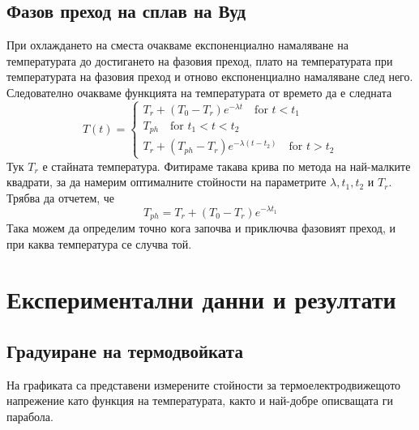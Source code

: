 \documentclass[aps, prb, twocolumn, a4paper, floatfix, reprint]{revtex4-2}
\begin{document}
\subsection{Фазов преход на сплав на Вуд}
При охлаждането на сместа очакваме експоненциално намаляване на температурата до достигането на фазовия преход, плато на температурата при температурата на фазовия преход и отново експоненциално намаляване след него. Следователно очакваме функцията на температурата от времето да е следната
\begin{equation*} \label{eq:1}
    T(t) = \begin{cases}
        T_r + (T_0 - T_r) e^{-\lambda t} \quad \text{for } t < t_1 \\
        T_{ph} \quad \text{for } t_1 < t < t_2 \\
        T_r + (T_{ph} - T_r) e^{-\lambda (t - t_2)} \quad \text{for } t > t_2
    \end{cases} \tag{1}
\end{equation*}
Тук $T_r$ е стайната температура. Фитираме такава крива по метода на най-малките квадрати, за да намерим оптималните стойности на параметрите $\lambda, t_1, t_2 \text{ и } T_r$. Трябва да отчетем, че
\begin{equation*}
    T_{ph} = T_r + (T_0 - T_r) e^{-\lambda t_1}
\end{equation*}
Така можем да определим точно кога започва и приключва фазовият преход, и при каква температура се случва той. 

\section{Експериментални данни и резултати}
\subsection{Градуиране на термодвойката}
На графиката са представени измерените стойности за термоелектродвижещото напрежение като функция на температурата, както и най-добре описващата ги парабола. 
\end{document}
